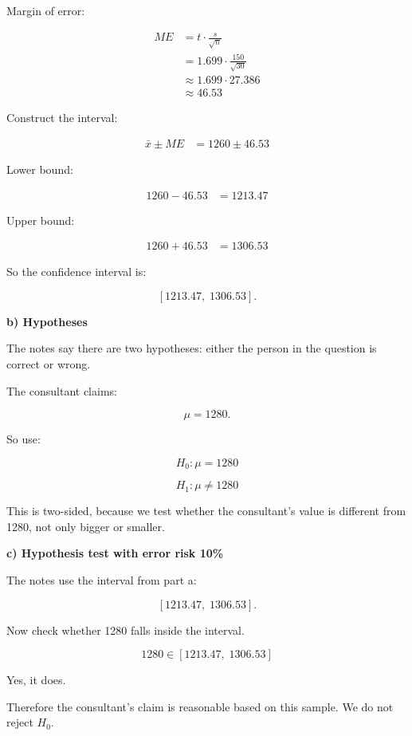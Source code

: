 \documentclass[10pt]{article}
\begin{document}
Margin of error:

\begin{align*}
ME
&=
t\cdot \frac{s}{\sqrt{n}} \\[2mm]
&=
1.699\cdot
\frac{150}{\sqrt{30}} \\[2mm]
&\approx
1.699\cdot 27.386 \\[2mm]
&\approx 46.53
\end{align*}

Construct the interval:

\begin{align*}
\bar{x}\pm ME
&=
1260\pm 46.53
\end{align*}

Lower bound:

\begin{align*}
1260-46.53
&=1213.47
\end{align*}

Upper bound:

\begin{align*}
1260+46.53
&=1306.53
\end{align*}

So the confidence interval is:

\[
[1213.47,\;1306.53].
\]

\RepeatedQuestion{\uppgiftSixQuestion}
\textbf{b) Hypotheses}

The notes say there are two hypotheses:
either the person in the question is correct or wrong.

The consultant claims:

\[
\mu=1280.
\]

So use:

\[
H_0:\mu=1280
\]

\[
H_1:\mu\neq 1280
\]

This is two-sided, because we test whether the consultant's value is
different from 1280, not only bigger or smaller.

\RepeatedQuestion{\uppgiftSixQuestion}
\textbf{c) Hypothesis test with error risk 10\%}

The notes use the interval from part a:

\[
[1213.47,\;1306.53].
\]

Now check whether 1280 falls inside the interval.

\[
1280\in [1213.47,\;1306.53]
\]

Yes, it does.

Therefore the consultant's claim is reasonable based on this sample.
We do not reject $H_0$.
\end{document}

